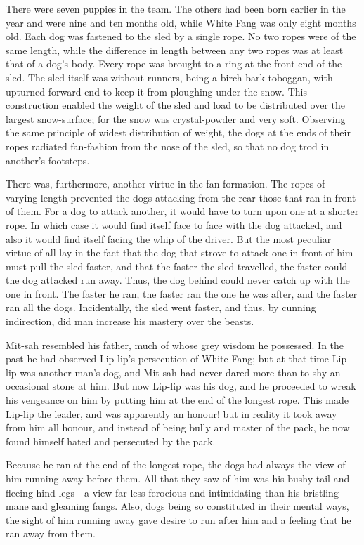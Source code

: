 \documentclass[10pt]{book}
\begin{document}
There were seven puppies in the team. The others had been born earlier
in the year and were nine and ten months old, while White Fang was only
eight months old. Each dog was fastened to the sled by a single rope.
No two ropes were of the same length, while the difference in length
between any two ropes was at least that of a dog’s body. Every rope was
brought to a ring at the front end of the sled. The sled itself was
without runners, being a birch-bark toboggan, with upturned forward end
to keep it from ploughing under the snow. This construction enabled the
weight of the sled and load to be distributed over the largest
snow-surface; for the snow was crystal-powder and very soft. Observing
the same principle of widest distribution of weight, the dogs at the
ends of their ropes radiated fan-fashion from the nose of the sled, so
that no dog trod in another’s footsteps.

There was, furthermore, another virtue in the fan-formation. The ropes
of varying length prevented the dogs attacking from the rear those that
ran in front of them. For a dog to attack another, it would have to
turn upon one at a shorter rope. In which case it would find itself
face to face with the dog attacked, and also it would find itself
facing the whip of the driver. But the most peculiar virtue of all lay
in the fact that the dog that strove to attack one in front of him must
pull the sled faster, and that the faster the sled travelled, the
faster could the dog attacked run away. Thus, the dog behind could
never catch up with the one in front. The faster he ran, the faster ran
the one he was after, and the faster ran all the dogs. Incidentally,
the sled went faster, and thus, by cunning indirection, did man
increase his mastery over the beasts.

Mit-sah resembled his father, much of whose grey wisdom he possessed.
In the past he had observed Lip-lip’s persecution of White Fang; but at
that time Lip-lip was another man’s dog, and Mit-sah had never dared
more than to shy an occasional stone at him. But now Lip-lip was his
dog, and he proceeded to wreak his vengeance on him by putting him at
the end of the longest rope. This made Lip-lip the leader, and was
apparently an honour! but in reality it took away from him all honour,
and instead of being bully and master of the pack, he now found himself
hated and persecuted by the pack.

Because he ran at the end of the longest rope, the dogs had always the
view of him running away before them. All that they saw of him was his
bushy tail and fleeing hind legs—a view far less ferocious and
intimidating than his bristling mane and gleaming fangs. Also, dogs
being so constituted in their mental ways, the sight of him running
away gave desire to run after him and a feeling that he ran away from
them.
\end{document}
